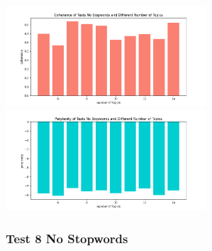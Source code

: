 \documentclass[10pt]{article} %
\begin{document}
	\begin{center}
		\includegraphics[width=7.5cm]{images/coherence_no_stopwords}
		\includegraphics[width=7.5cm]{images/perplexity_no_stopwords}
	\end{center}

	\subsubsection{Test 8 No Stopwords}\label{test_8_ns_1}
	
\end{document}
